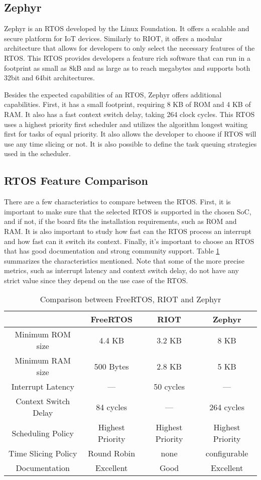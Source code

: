 \subsection{Zephyr}
Zephyr is an RTOS developed by the Linux Foundation. It offers a scalable and secure platform for IoT devices. Similarly to RIOT, it offers a modular architecture that allows for developers to only select the necessary features of the RTOS. This RTOS provides developers a feature rich software that can run in a footprint as small as 8kB and as large as to reach megabytes and supports both 32bit and 64bit architectures.

Besides the expected capabilities of an RTOS, Zephyr offers additional capabilities. First, it has a small footprint, requiring 8 KB of ROM and 4 KB of RAM. It also has a fast context switch delay, taking 264 clock cycles. This RTOS uses a highest priority first scheduler and utilizes the algorithm longest waiting first for tasks of equal priority. It also allows the developer to choose if RTOS will use any time slicing or not. It is also possible to define the task queuing strategies used in the scheduler. 

\subsection{RTOS Feature Comparison}
There are a few characteristics to compare between the RTOS. First, it is important to make sure that the selected RTOS is supported in the chosen SoC, and if not, if the board fits the installation requirements, such as ROM and RAM. It is also important to study how fast can the RTOS process an interrupt and how fast can it switch its context. Finally, it's important to choose an RTOS that has good documentation and strong community support. Table \ref{tab:comparação RTOS} summarizes the characteristics mentioned. Note that some of the more precise metrics, such as interrupt latency and context switch delay, do not have any strict value since they depend on the use case of the RTOS.


\begin{table}[H]
    \centering
    \begin{tabular}{ c | c | c | c }
          & FreeRTOS & RIOT & Zephyr \\ 
        \hline
        Minimum ROM size & 4.4 KB & 3.2 KB & 8 KB\\  
        Minimum RAM size & 500 Bytes & 2.8 KB & 5 KB\\ 
        \hline
        Interrupt Latency & --- & 50 cycles & ---\\
        Context Switch Delay & 84 cycles & --- & 264 cycles \\
        Scheduling Policy & Highest Priority & Highest Priority& Highest Priority\\
        Time Slicing Policy & Round Robin & none & configurable \\
        \hline
        Documentation & Excellent & Good & Excellent\\
    \end{tabular}
    \label{tab:comparação RTOS}
    \caption{Comparison between FreeRTOS, RIOT and Zephyr}
\end{table}

